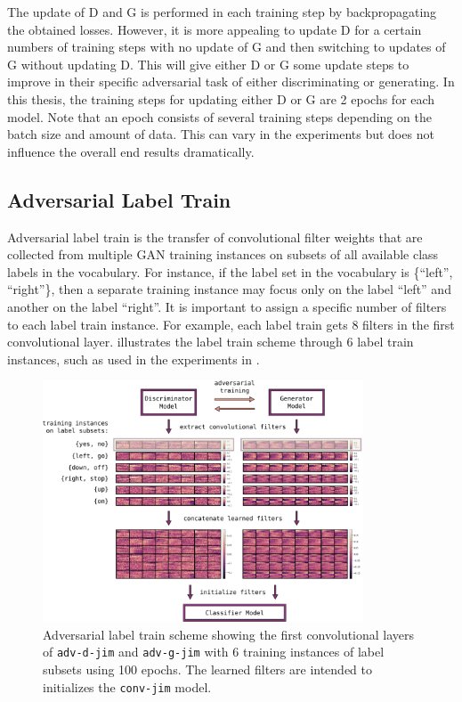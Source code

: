 The update of D and G is performed in each training step by backpropagating the obtained losses.
However, it is more appealing to update D for a certain numbers of training steps with no update of G and then switching to updates of G without updating D.
This will give either D or G some update steps to improve in their specific adversarial task of either discriminating or generating.
In this thesis, the training steps for updating either D or G are 2 epochs for each model.
Note that an epoch consists of several training steps depending on the batch size and amount of data.
This can vary in the experiments but does not influence the overall end results dramatically.



\subsection{Adversarial Label Train}
Adversarial label train is the transfer of convolutional filter weights that are collected from multiple GAN training instances on subsets of all available class labels in the vocabulary.
For instance, if the label set in the vocabulary is \{\enquote{left}, \enquote{right}\}, then a separate training instance may focus only on the label \enquote{left} and another on the label \enquote{right}.
It is important to assign a specific number of filters to each label train instance.
For example, each label train gets 8 filters in the first convolutional layer.
 illustrates the label train scheme through 6 label train instances, such as used in the experiments in .
\begin{figure}[!ht]
  \centering
    \includegraphics[width=0.85\textwidth]{./4_nn/figs/nn_adv_label_scheme.pdf}
  \caption{Adversarial label train scheme showing the first convolutional layers of \texttt{adv-d-jim} and \texttt{adv-g-jim} with 6 training instances of label subsets using 100 epochs. The learned filters are intended to initializes the \texttt{conv-jim} model.}
  \label{fig:nn_adv_label_scheme}
\end{figure}
